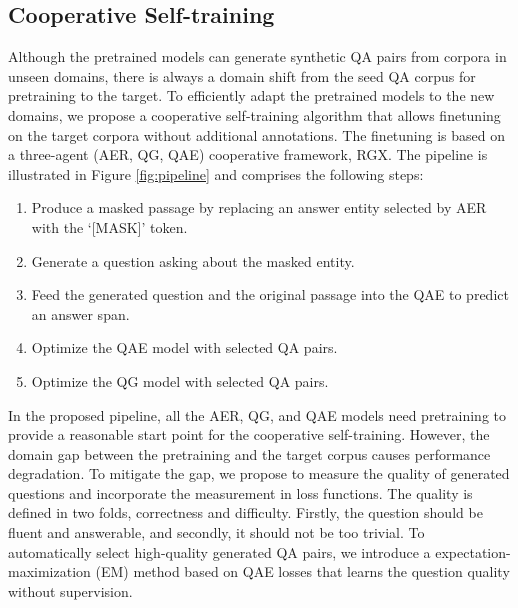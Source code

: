 \documentclass[11pt,a4paper]{article}
\begin{document}
\subsection{Cooperative Self-training}
\label{sec:coop}
Although the pretrained models can generate synthetic QA pairs from corpora in unseen domains, there is always a domain shift from the seed QA corpus for pretraining to the target. To efficiently adapt the pretrained models to the new domains, we propose a cooperative self-training algorithm that allows finetuning on the target corpora without additional annotations. The finetuning is based on a three-agent (AER, QG, QAE) cooperative framework, RGX.
The pipeline is illustrated in Figure \ref{fig:pipeline} and comprises the following steps:
\begin{enumerate} \setlength{\itemsep}{0pt} \setlength{\parsep}{0pt}
\small
\item Produce a masked passage by replacing an answer entity selected by AER with the `[MASK]' token.
\item Generate a question asking about the masked entity.
\item Feed the generated question and the original passage into the QAE to predict an answer span.
\item Optimize the QAE model with selected QA pairs.
\item Optimize the QG model with selected QA pairs.
\end{enumerate}



In the proposed pipeline, all the AER, QG, and QAE models need pretraining to provide a reasonable start point for the cooperative self-training. However, the domain gap between the pretraining and the target corpus causes performance degradation. To mitigate the gap, we propose to measure the quality of generated questions and incorporate the measurement in loss functions. The quality is defined in two folds, correctness and difficulty.  Firstly, the question should be fluent and answerable, and secondly, it should not be too trivial.  To automatically select high-quality generated QA pairs, we introduce a expectation-maximization (EM) method based on QAE losses that learns the question quality without supervision. 
\end{document}
